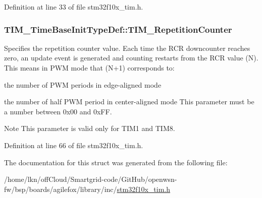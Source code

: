 Definition at line 33 of file stm32f10x\+\_\+tim.\+h.

\subsubsection[{\texorpdfstring{T\+I\+M\+\_\+\+Repetition\+Counter}{TIM_RepetitionCounter}}]{ T\+I\+M\+\_\+\+Time\+Base\+Init\+Type\+Def\+::\+T\+I\+M\+\_\+\+Repetition\+Counter}\hypertarget{struct_t_i_m___time_base_init_type_def_a81648259851390e090e1f507dfea7de8}{}\label{struct_t_i_m___time_base_init_type_def_a81648259851390e090e1f507dfea7de8}
Specifies the repetition counter value. Each time the R\+CR downcounter reaches zero, an update event is generated and counting restarts from the R\+CR value (N). This means in P\+WM mode that (N+1) corresponds to\+:
\begin{DoxyItemize}
\item the number of P\+WM periods in edge-\/aligned mode
\item the number of half P\+WM period in center-\/aligned mode This parameter must be a number between 0x00 and 0x\+FF. \begin{DoxyNote}{Note}
This parameter is valid only for T\+I\+M1 and T\+I\+M8. 
\end{DoxyNote}

\end{DoxyItemize}

Definition at line 66 of file stm32f10x\+\_\+tim.\+h.



The documentation for this struct was generated from the following file\+:\begin{DoxyCompactItemize}
\item 
/home/lkn/off\+Cloud/\+Smartgrid-\/code/\+Git\+Hub/openwsn-\/fw/bsp/boards/agilefox/library/inc/\hyperlink{agilefox_2library_2inc_2stm32f10x__tim_8h}{stm32f10x\+\_\+tim.\+h}\end{DoxyCompactItemize}
